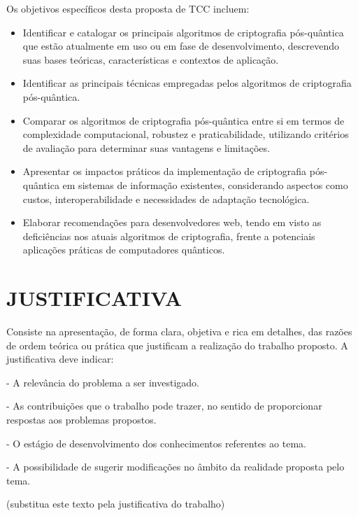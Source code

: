 Os objetivos específicos desta proposta de TCC incluem:
\begin{itemize}
	\item Identificar e catalogar os principais algoritmos de criptografia pós-quântica que estão atualmente em uso ou em fase de desenvolvimento, descrevendo suas bases teóricas, características e contextos de aplicação.
	\item Identificar as principais técnicas empregadas pelos algoritmos de criptografia pós-quântica.
	\item Comparar os algoritmos de criptografia pós-quântica entre si em termos de complexidade computacional, robustez e praticabilidade, utilizando critérios de avaliação para determinar suas vantagens e limitações.
	\item Apresentar os impactos práticos da implementação de criptografia pós-quântica em sistemas de informação existentes, considerando aspectos como custos, interoperabilidade e necessidades de adaptação tecnológica.
	\item Elaborar recomendações para desenvolvedores web, tendo em visto as deficiências nos atuais algoritmos de criptografia, frente a potenciais aplicações práticas de computadores quânticos.
\end{itemize}


\section{JUSTIFICATIVA}
\label{sec:justificativa}

Consiste na apresentação, de forma clara, objetiva e rica em detalhes, das razões de ordem teórica ou prática que justificam a realização do trabalho proposto. A justificativa deve indicar:

- A relevância do problema a ser investigado.

- As contribuições que o trabalho pode trazer, no sentido de proporcionar respostas aos problemas propostos.

- O estágio de desenvolvimento dos conhecimentos referentes ao tema.

- A possibilidade de sugerir modificações no âmbito da realidade proposta pelo tema.


(substitua este texto pela justificativa do trabalho)


